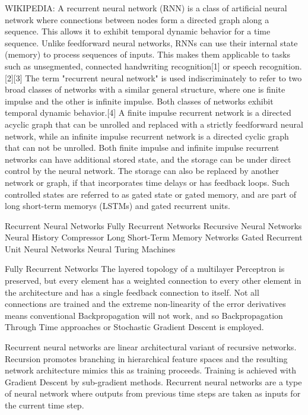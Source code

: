 WIKIPEDIA:  A recurrent neural network (RNN) is a class of artificial neural network where connections between nodes form a directed graph along a sequence. This allows it to exhibit temporal dynamic behavior for a time sequence. Unlike feedforward neural networks, RNNs can use their internal state (memory) to process sequences of inputs. This makes them applicable to tasks such as unsegmented, connected handwriting recognition[1] or speech recognition.[2][3]
The term "recurrent neural network" is used indiscriminately to refer to two broad classes of networks with a similar general structure, where one is finite impulse and the other is infinite impulse. Both classes of networks exhibit temporal dynamic behavior.[4] A finite impulse recurrent network is a directed acyclic graph that can be unrolled and replaced with a strictly feedforward neural network, while an infinite impulse recurrent network is a directed cyclic graph that can not be unrolled.
Both finite impulse and infinite impulse recurrent networks can have additional stored state, and the storage can be under direct control by the neural network. The storage can also be replaced by another network or graph, if that incorporates time delays or has feedback loops. Such controlled states are referred to as gated state or gated memory, and are part of long short-term memorys (LSTMs) and gated recurrent units. 


    Recurrent Neural Networks
        Fully Recurrent Networks
        Recursive Neural Networks
        Neural History Compressor
    Long Short-Term Memory Networks
    Gated Recurrent Unit Neural Networks
    Neural Turing Machines

Fully Recurrent Networks
The layered topology of a multilayer Perceptron is preserved, but every element has a weighted connection to every other element in the architecture and has a single feedback connection to itself.
Not all connections are trained and the extreme non-linearity of the error derivatives means conventional Backpropagation will not work, and so Backpropagation Through Time approaches or Stochastic Gradient Descent is employed.

Recurrent neural networks are linear architectural variant of recursive networks.
Recursion promotes branching in hierarchical feature spaces and the resulting network architecture mimics this as training proceeds.
Training is achieved with Gradient Descent by sub-gradient methods.
Recurrent neural networks are a type of neural network where outputs from previous time steps are taken as inputs for the current time step.

